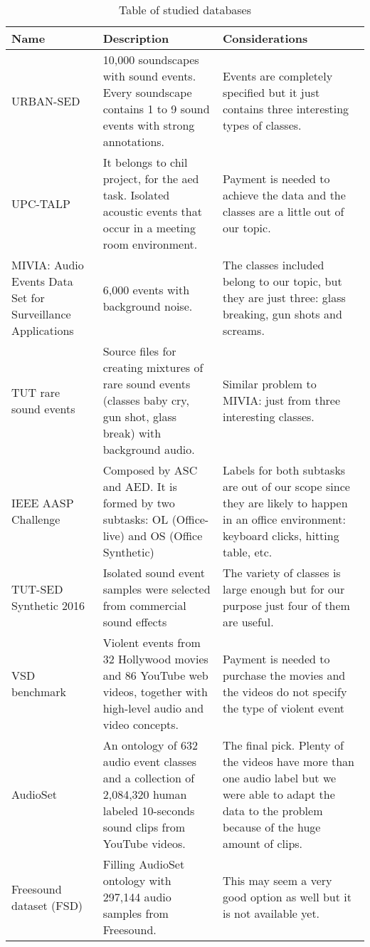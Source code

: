 
\begin{table}[h!]
\begin{center}
	\begin{tabular}{|| m{5em} | m{12em} | m{17em} ||}
	\hline
	\textbf{Name} & \textbf{Description} & \textbf{Considerations} \\
	\hline\hline
	URBAN-SED \cite{Salamon2017} & 10,000 soundscapes with sound events. Every soundscape contains 1 to 9 sound events with strong annotations. & Events are completely specified but it just contains three interesting types of classes. \\
	\hline
	UPC-TALP \cite{Mapell2012} & It belongs to \acrshort{chil} project, for the \acrshort{aed} task. Isolated acoustic events that occur in a meeting room environment. & Payment is needed to achieve the data and the classes are a little out of our topic. \\
	\hline
	MIVIA: Audio Events Data Set for Surveillance Applications \cite{Foggia2015} & 6,000 events with background noise. & The classes included belong to our topic, but they are just three: glass breaking, gun shots and screams. \\
	\hline
	TUT rare sound events \cite{Fagerlund2017} & Source files for creating mixtures of rare sound events (classes baby cry, gun shot, glass break) with background audio. & Similar problem to MIVIA: just from three interesting classes. \\
	\hline
	IEEE AASP Challenge \cite{Stowell2013} & Composed by ASC and AED. It is formed by two subtasks: OL (Office-live) and OS (Office Synthetic) & Labels for both subtasks are out of our scope since they are likely to happen in an office environment: keyboard clicks, hitting table, etc. \\
	\hline
	TUT-SED Synthetic 2016 \cite{Cakir2016} & Isolated sound event samples were selected from commercial sound effects & The variety of classes is large enough but for our purpose just four of them are useful. \\
	\hline
	VSD benchmark \cite{Demarty2015} & Violent events from 32 Hollywood movies and 86 YouTube web videos, together with high-level audio and video concepts. & Payment is needed to purchase the movies and the videos do not specify the type of violent event \\
	\hline
	AudioSet \cite{Gemmeke2017} & An ontology of 632 audio event classes and a collection of 2,084,320 human labeled 10-seconds sound clips from YouTube videos. & The final pick. Plenty of the videos have more than one audio label but we were able to adapt the data to the problem because of the huge amount of clips. \\
	\hline
	Freesound dataset (FSD) \cite{Fonseca2017} & Filling AudioSet ontology with 297,144 audio samples from Freesound. & This may seem a very good option as well but it is not available yet. \\
	\hline
	\end{tabular}
\end{center}
\caption{Table of studied databases}
\label{table:1}
\end{table}
